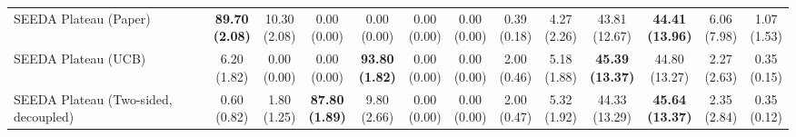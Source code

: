 \begin{table}[H]
{\begin{tabular}{l|cccccc|cccccc}
SEEDA Plateau (Paper) & \bfseries \makecell{89.70 \\ (2.08)} & \makecell{10.30 \\ (2.08)} & {\cellcolor[HTML]{C8E6C9}} \makecell{0.00 \\ (0.00)} & \makecell{0.00 \\ (0.00)} & \makecell{0.00 \\ (0.00)} & \makecell{0.00 \\ (0.00)} & \makecell{0.39 \\ (0.18)} & \makecell{4.27 \\ (2.26)} & {\cellcolor[HTML]{C8E6C9}} \makecell{43.81 \\ (12.67)} & \bfseries \makecell{44.41 \\ (13.96)} & \makecell{6.06 \\ (7.98)} & \makecell{1.07 \\ (1.53)} \\
SEEDA Plateau (UCB) & \makecell{6.20 \\ (1.82)} & \makecell{0.00 \\ (0.00)} & {\cellcolor[HTML]{C8E6C9}} \makecell{0.00 \\ (0.00)} & \bfseries \makecell{93.80 \\ (1.82)} & \makecell{0.00 \\ (0.00)} & \makecell{0.00 \\ (0.00)} & \makecell{2.00 \\ (0.46)} & \makecell{5.18 \\ (1.88)} & {\cellcolor[HTML]{C8E6C9}} \bfseries \makecell{45.39 \\ (13.37)} & \makecell{44.80 \\ (13.27)} & \makecell{2.27 \\ (2.63)} & \makecell{0.35 \\ (0.15)} \\
SEEDA Plateau (Two-sided, decoupled) & \makecell{0.60 \\ (0.82)} & \makecell{1.80 \\ (1.25)} & {\cellcolor[HTML]{C8E6C9}} \bfseries \makecell{87.80 \\ (1.89)} & \makecell{9.80 \\ (2.66)} & \makecell{0.00 \\ (0.00)} & \makecell{0.00 \\ (0.00)} & \makecell{2.00 \\ (0.47)} & \makecell{5.32 \\ (1.92)} & {\cellcolor[HTML]{C8E6C9}} \makecell{44.33 \\ (13.29)} & \bfseries \makecell{45.64 \\ (13.37)} & \makecell{2.35 \\ (2.84)} & \makecell{0.35 \\ (0.12)} \\

\end{tabular}}
\end{table}
